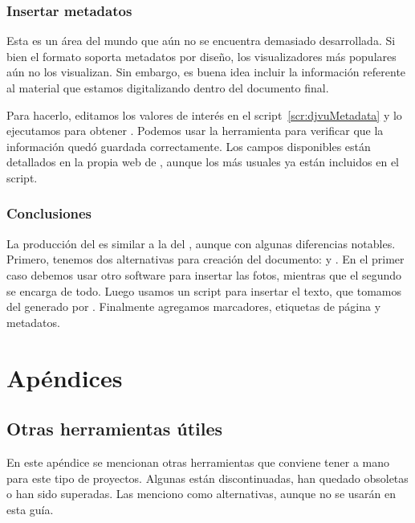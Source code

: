\documentclass[%
	a5paper,
	10pt,
	twoside,
	openright,
	final,
]{memoir}
\begin{document}
	\section{Insertar metadatos\label{sec:djvuMetadata}} Esta es un área del mundo \djvu que aún no se encuentra demasiado desarrollada. Si bien el formato soporta metadatos por diseño, los visualizadores más populares aún no los visualizan. Sin embargo, es buena idea incluir la información referente al material que estamos digitalizando dentro del documento final.

	Para hacerlo, editamos los valores de interés en el script~\ref{scr:djvuMetadata} y lo ejecutamos para obtener . Podemos usar la herramienta \exiftool para verificar que la información quedó guardada correctamente. Los campos disponibles están detallados en la propia web de \exiftool \cite{DjVuTags}, aunque los más usuales ya están incluidos en el script.


	\section{Conclusiones} La producción del \djvu es similar a la del \pdf, aunque con algunas diferencias notables. Primero, tenemos dos alternativas para creación del documento: \djvusmall y \djvusmallmod. En el primer caso debemos usar otro software para insertar las fotos, mientras que el segundo se encarga de todo. Luego usamos un script para insertar el texto, que tomamos del \djvu generado por \abby. Finalmente agregamos marcadores, etiquetas de página y metadatos.

	\part{Apéndices}\appendix

	\chapter{Otras herramientas útiles} En este apéndice se mencionan otras herramientas que conviene tener a mano para este tipo de proyectos. Algunas están discontinuadas, han quedado obsoletas o han sido superadas. Las menciono como alternativas, aunque no se usarán en esta guía.
\end{document}
